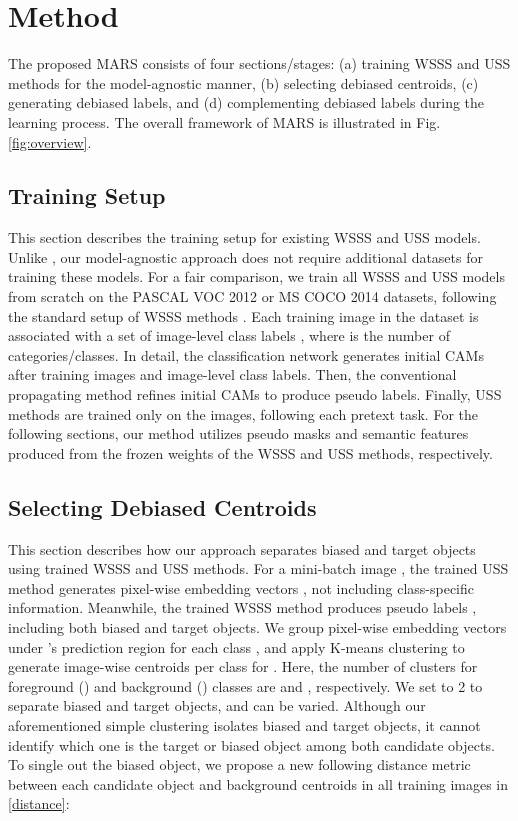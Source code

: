 \documentclass[10pt,twocolumn,letterpaper]{article}
\begin{document}
\section{Method}\label{sec:metho}





The proposed MARS consists of four sections/stages: (a) training WSSS and USS methods for the model-agnostic manner, (b) selecting debiased centroids, (c) generating debiased labels, and (d) complementing debiased labels during the learning process. 
The overall framework of MARS is illustrated in Fig. \ref{fig:overview}.

\subsection{Training Setup} \label{sec:setup}


This section describes the training setup for existing WSSS and USS models. Unlike \cite{xie2022clims, lee2022weakly}, our model-agnostic approach does not require additional datasets for training these models. For a fair comparison, we train all WSSS and USS models from scratch on the PASCAL VOC 2012 or MS COCO 2014 datasets, following the standard setup of WSSS methods \cite{ahn2019weakly, wang2020self, lee2021anti, jo2022recurseed}. Each training image  in the dataset is associated with a set of image-level class labels , where  is the number of categories/classes. In detail, the classification network generates initial CAMs after training images and image-level class labels. Then, the conventional propagating method \cite{ahn2019weakly} refines initial CAMs to produce pseudo labels. Finally, USS methods \cite{ziegler2022self, hamilton2022unsupervised} are trained only on the images, following each pretext task. For the following sections, our method utilizes pseudo masks and semantic features produced from the frozen weights of the WSSS and USS methods, respectively.


\subsection{Selecting Debiased Centroids} \label{sec:selecting}

This section describes how our approach separates biased and target objects using trained WSSS and USS methods. For a mini-batch image , the trained USS method generates pixel-wise embedding vectors , not including class-specific information. Meanwhile, the trained WSSS method produces pseudo labels , including both biased and target objects. We group pixel-wise embedding vectors  under 's prediction region  for each class , and apply K-means clustering to generate image-wise centroids  per class  for . Here, the number  of clusters for foreground () and background () classes are  and , respectively. We set  to 2 to separate biased and target objects, and  can be varied. 
Although our aforementioned simple clustering isolates biased and target objects, it cannot identify which one is the target or biased object among both candidate objects. To single out the biased object, we propose a new following distance metric between each candidate object and background centroids in all training images in \eqref{distance}:
 
\end{document}
